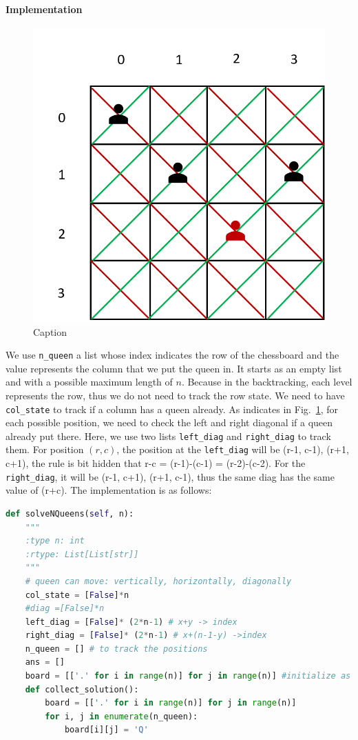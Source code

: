 \documentclass[../main.tex]{subfiles}
\begin{document}
\begin{enumerate}
\paragraph{Implementation} 
\begin{figure}[!ht]
    \centering
    \includegraphics[width=0.6\columnwidth]{fig/n_queen_diag.png}
    \caption{Caption}
    \label{fig:my_n_queen_diag}
\end{figure}

We use \texttt{n\_queen} a list whose index indicates the row of the chessboard and the value represents the column that we put the queen in. It starts as an empty list and with a possible maximum length of $n$. Because in the backtracking, each level represents the row, thus we do not need to track the row state. We need to have \texttt{col\_state} to track if a column has a queen already. As indicates in Fig.~\ref{fig:my_n_queen_diag}, for each possible position, we need to check the left and right diagonal if a queen already put there. Here, we use two lists \texttt{left\_diag} and \texttt{right\_diag} to track them. For position $(r, c)$, the position at the \texttt{left\_diag} will be (r-1, c-1), (r+1, c+1), the rule is bit hidden that r-c = (r-1)-(c-1) = (r-2)-(c-2). For the \texttt{right\_diag}, it will be (r-1, c+1), (r+1, c-1), thus the same diag has the same value of (r+c). The implementation is as follows:
\begin{lstlisting}[language=Python]
def solveNQueens(self, n):
    """
    :type n: int
    :rtype: List[List[str]]
    """
    # queen can move: vertically, horizontally, diagonally 
    col_state = [False]*n
    #diag =[False]*n
    left_diag = [False]* (2*n-1) # x+y -> index
    right_diag = [False]* (2*n-1) # x+(n-1-y) ->index
    n_queen = [] # to track the positions
    ans = []
    board = [['.' for i in range(n)] for j in range(n)] #initialize as '.' we can try to flip
    def collect_solution():
        board = [['.' for i in range(n)] for j in range(n)] 
        for i, j in enumerate(n_queen):
            board[i][j] = 'Q'
            

\end{lstlisting}
\end{enumerate}
\end{document}
